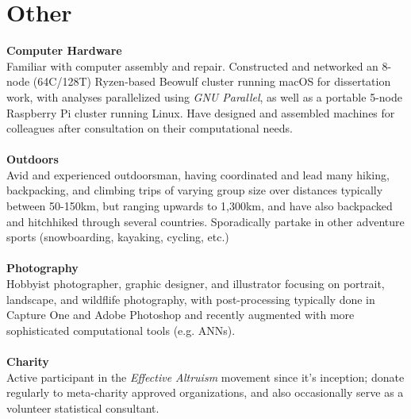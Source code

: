 \documentclass[12pt]{article}
\begin{document}
\section{Other}
\textbf{Computer Hardware}\\ Familiar with computer assembly and repair. Constructed and networked an 8-node (64C/128T) Ryzen-based Beowulf cluster running macOS for dissertation work, with analyses parallelized using \emph{GNU Parallel}, as well as a portable 5-node Raspberry Pi cluster running Linux. Have designed and assembled machines for colleagues after consultation on their computational needs.\\\\
\textbf{Outdoors}\\ Avid and experienced outdoorsman, having coordinated and lead many hiking, backpacking, and climbing trips of varying group size over distances typically between 50-150km, but ranging upwards to 1,300km, and have also backpacked and hitchhiked through several countries. Sporadically partake in other adventure sports (snowboarding, kayaking, cycling, etc.) \\\\
\textbf{Photography}\\ Hobbyist photographer, graphic designer, and illustrator focusing on portrait, landscape, and wildflife photography, with post-processing typically done in Capture One and Adobe Photoshop and recently augmented with more sophisticated computational tools (e.g. ANNs).\\\\
\textbf{Charity}\\ Active participant in the \emph{Effective Altruism} movement since it's inception; donate regularly to meta-charity approved organizations, and also occasionally serve as a volunteer statistical consultant.\\\\

\end{document}

